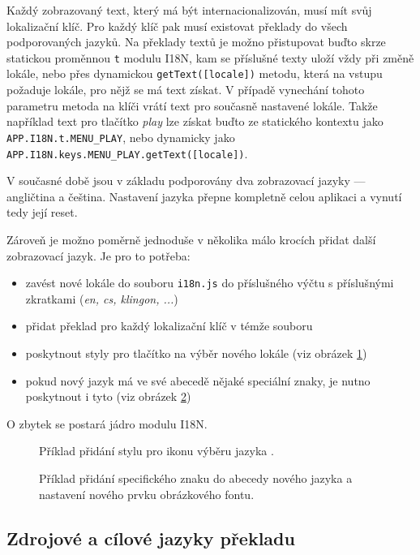 Každý zobrazovaný text, který má být internacionalizován, musí mít svůj lokalizační klíč. Pro každý klíč pak musí existovat překlady do všech podporovaných jazyků. Na překlady textů je možno přistupovat buďto skrze statickou proměnnou \verb|t| modulu I18N, kam se příslušné texty uloží vždy při změně lokále, nebo přes dynamickou \verb|getText([locale])| metodu, která na vstupu požaduje lokále, pro nějž se má text získat. V případě vynechání tohoto parametru metoda na klíči vrátí text pro současně nastavené lokále. Takže například text pro tlačítko {\sl play} lze získat buďto ze statického kontextu jako \verb|APP.I18N.t.MENU_PLAY|, nebo dynamicky jako \verb|APP.I18N.keys.MENU_PLAY.getText([locale])|.

V současné době jsou v základu podporovány dva zobrazovací jazyky --- angličtina a čeština. Nastavení jazyka přepne kompletně celou aplikaci a vynutí tedy její reset.

Zároveň je možno poměrně jednoduše v několika málo krocích přidat další zobrazovací jazyk. Je pro to potřeba:

\begin{itemize}
\item zavést nové lokále do souboru \verb|i18n.js| do příslušného výčtu s příslušnými zkratkami ({\sl en, cs, klingon, ...})
\item přidat překlad pro každý lokalizační klíč v témže souboru
\item poskytnout styly pro tlačítko na výběr nového lokále (viz obrázek \ref{fig:locale_style})
\item pokud nový jazyk má ve své abecedě nějaké speciální znaky, je nutno poskytnout i tyto (viz obrázek \ref{fig:locale_letter})
\end{itemize}

O zbytek se postará jádro modulu I18N.
\\
\begin{figure}[h]
	
	\caption{Příklad přidání stylu pro ikonu výběru jazyka .}
	\label{fig:locale_style}
\end{figure}

\begin{figure}[h]
	
	\caption{Příklad přidání specifického znaku do abecedy nového jazyka a nastavení nového prvku obrázkového fontu.}
	\label{fig:locale_letter}
\end{figure}

\subsection{Zdrojové a cílové jazyky překladu}

